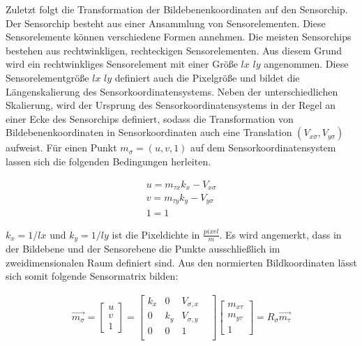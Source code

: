 Zuletzt folgt die Transformation der Bildebenenkoordinaten auf den Sensorchip. Der Sensorchip besteht aus einer Ansammlung von Sensorelementen. Diese Sensorelemente können verschiedene Formen annehmen. Die meisten Sensorchips bestehen aus rechtwinkligen, rechteckigen Sensorelementen. Aus diesem Grund wird ein rechtwinkliges Sensorelement mit einer Größe $lx$ $ly$ angenommen. Diese Sensorelementgröße $lx$ $ly$ definiert auch die Pixelgröße und bildet die Längenskalierung des Sensorkoordinatensystems. Neben der unterschiedlichen Skalierung, wird der Ursprung des Sensorkoordinatensystems in der Regel an einer Ecke des Sensorchips definiert, sodass die Transformation von Bildebenenkoordinaten in Sensorkoordinaten auch eine Translation $(V_{x\sigma},V_{y\sigma})$ aufweist\cite{HZ,Photonik}. Für einen Punkt $m_\sigma = ({u},{v},1)$ auf dem Sensorkoordinatensystem lassen sich die folgenden Bedingungen herleiten. %

\begin{gather}	
	{u}=m_{\tau x} k_x - V_{x\sigma}\\
	{v}=m_{\tau y} k_y - V_{y\sigma}\\
	1=1
\end{gather}

$k_x=1/lx$ und $k_y=1/ly$ ist die Pixeldichte in $\frac{pixel}{m}$.
Es wird angemerkt, dass in der Bildebene und der Sensorebene die Punkte ausschließlich im zweidimensionalen Raum definiert sind. Aus den normierten Bildkoordinaten lässt sich somit folgende Sensormatrix bilden:

\begin{gather}
	\vec{m_\sigma}=\begin{bmatrix}u \\v\\1 \end{bmatrix}=
	\begin{bmatrix}
		k_x&0&V_{\sigma,x}\\
		0&k_y&V_{\sigma,y}\\
		0&0&1&\\
	\end{bmatrix}
	\begin{bmatrix}m_{x \tau}\\ m_{y \tau}\\ 1\end{bmatrix}= R_\sigma \vec{m_\tau}
\end{gather}

